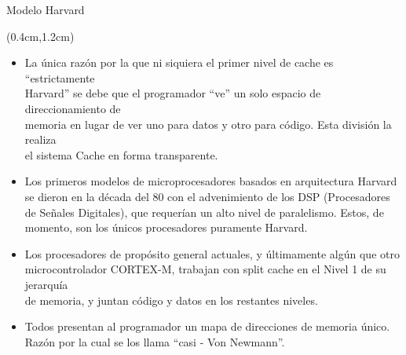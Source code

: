 \documentclass[table,dvipsnames,aspectratio=169]{beamer}
\begin{document}
\begin{frame}{Modelo Harvard }
 \begin{textblock*}{\textwidth}(0.4cm,1.2cm)
  \begin{itemize}[<+->] \justifying \parskip 0.2cm
   \item La única razón por la que ni siquiera el primer nivel de cache es \textcolor{furfiBlue}{``estrictamente\\
   Harvard'' se debe que el programador ``ve'' un solo espacio de direccionamiento} de\\
   memoria en lugar de ver uno para datos y otro para código. Esta división la realiza\\
   el sistema Cache en forma transparente.
   \item Los primeros modelos de microprocesadores basados en arquitectura Harvard\\
   se dieron en la década del 80 con el advenimiento de los DSP {\small (Procesadores de Señales Digitales)}, que requerían un alto nivel de paralelismo. {\small \textcolor{furfiBlue}{Estos, de momento, son los únicos procesadores puramente Harvard.}}
   \item Los procesadores de propósito general actuales, y últimamente algún que otro\\
   microcontrolador CORTEX-M, trabajan con \textcolor{furfiBlue}{split cache en el Nivel 1 de su jerarquía}\\
   de memoria, y juntan código y datos en los restantes niveles.
   \item Todos presentan al programador un mapa de direcciones de memoria único.\\
   Razón por la cual se los llama \textcolor{furfiBlue}{``casi - Von Newmann''}.
  \end{itemize}
 \end{textblock*}
\end{frame}
\end{document}
